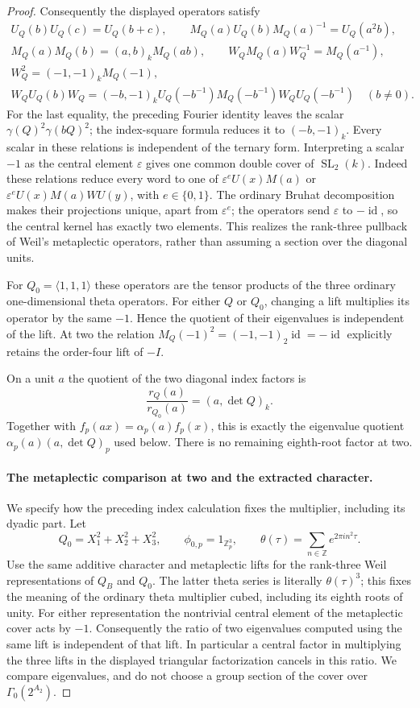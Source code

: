 \begin{proof}
Consequently the displayed operators satisfy
\[
 \begin{gathered}
 U_Q(b)U_Q(c)=U_Q(b+c),\qquad
 M_Q(a)U_Q(b)M_Q(a)^{-1}=U_Q(a^2b),\\
 M_Q(a)M_Q(b)=(a,b)_kM_Q(ab),\qquad
 W_QM_Q(a)W_Q^{-1}=M_Q(a^{-1}),\\
 W_Q^2=(-1,-1)_kM_Q(-1),\\
 W_QU_Q(b)W_Q
 =(-b,-1)_kU_Q(-b^{-1})M_Q(-b^{-1})W_QU_Q(-b^{-1})
 \quad(b\ne0).
 \end{gathered}
\]
For the last equality, the preceding Fourier identity leaves
the scalar $\gamma(Q)^2\gamma(bQ)^2$; the index-square formula
reduces it to $(-b,-1)_k$. Every scalar in these relations is
independent of the ternary form. Interpreting a scalar $-1$ as
the central element $\varepsilon$ gives one common double
cover of $\operatorname{SL}_2(k)$. Indeed these relations reduce
every word to one of
$\varepsilon^eU(x)M(a)$ or
$\varepsilon^eU(x)M(a)WU(y)$, with $e\in\{0,1\}$.
The ordinary Bruhat decomposition makes their projections
unique, apart from $\varepsilon^e$; the operators send
$\varepsilon$ to $-\operatorname{id}$, so the central kernel
has exactly two elements. This realizes the rank-three pullback
of Weil's metaplectic operators, rather than assuming a section
over the diagonal units.

For $Q_0=\langle1,1,1\rangle$ these operators are the tensor
products of the three ordinary one-dimensional theta operators.
For either $Q$ or $Q_0$, changing a lift multiplies its operator
by the same $-1$. Hence the quotient of their eigenvalues is
independent of the lift. At two the relation
$M_Q(-1)^2=(-1,-1)_2\operatorname{id}=-\operatorname{id}$
explicitly retains the order-four lift of $-I$.

On a unit $a$ the quotient of the two diagonal index factors is
\[
 \frac{r_Q(a)}{r_{Q_0}(a)}=(a,\det Q)_k.
\]
Together with $f_p(ax)=\alpha_p(a)f_p(x)$, this is exactly
the eigenvalue quotient $\alpha_p(a)(a,\det Q)_p$ used below.
There is no remaining eighth-root factor at two.

\paragraph{The metaplectic comparison at two and the extracted character.}
We specify how the preceding index calculation fixes the multiplier,
including its dyadic part. Let
\[
 Q_0=X_1^2+X_2^2+X_3^2,\qquad
 \phi_{0,p}=1_{\mathbb Z_p^3},\qquad
 \theta(\tau)=\sum_{n\in\mathbb Z}e^{2\pi i n^2\tau}.
\]
Use the same additive character and metaplectic lifts for the
rank-three Weil representations of $Q_B$ and $Q_0$. The latter
theta series is literally $\theta(\tau)^3$; this fixes the meaning
of the ordinary theta multiplier cubed, including its eighth roots
of unity. For either representation the nontrivial central element
of the metaplectic cover acts by $-1$. Consequently the ratio of
two eigenvalues computed using the same lift is independent of
that lift. In particular a central factor in multiplying the
three lifts in the displayed triangular factorization cancels
in this ratio. We compare eigenvalues, and do not choose a group
section of the cover over $\Gamma_0(2^{A_2})$.


\end{proof}
